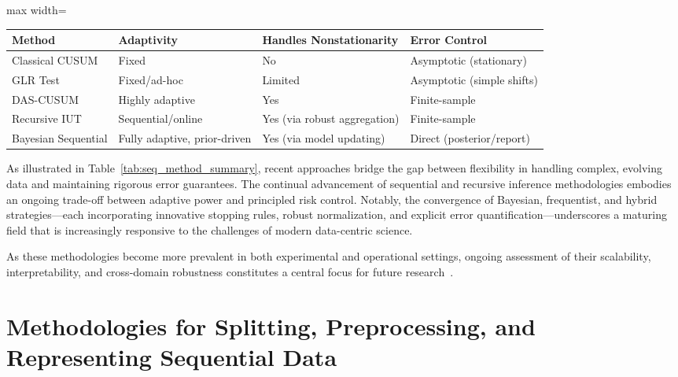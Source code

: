 \documentclass[sigconf]{acmart}
\begin{document}
\begin{table*}[htbp]
\centering
\caption{Summary of Key Sequential Testing Methodologies and Features}
\label{tab:seq_method_summary}
\begin{adjustbox}{max width=\textwidth}
\begin{tabular}{llll}
\toprule
\textbf{Method}            & \textbf{Adaptivity}           & \textbf{Handles Nonstationarity}  & \textbf{Error Control}      \\
\midrule
Classical CUSUM           & Fixed                         & No                                & Asymptotic (stationary)     \\
GLR Test                  & Fixed/ad-hoc                  & Limited                           & Asymptotic (simple shifts)  \\
DAS-CUSUM                 & Highly adaptive               & Yes                               & Finite-sample               \\
Recursive IUT             & Sequential/online             & Yes (via robust aggregation)      & Finite-sample               \\
Bayesian Sequential       & Fully adaptive, prior-driven  & Yes (via model updating)          & Direct (posterior/report)   \\
\bottomrule
\end{tabular}
\end{adjustbox}
\end{table*}

As illustrated in Table~\ref{tab:seq_method_summary}, recent approaches bridge the gap between flexibility in handling complex, evolving data and maintaining rigorous error guarantees. The continual advancement of sequential and recursive inference methodologies embodies an ongoing trade-off between adaptive power and principled risk control. Notably, the convergence of Bayesian, frequentist, and hybrid strategies—each incorporating innovative stopping rules, robust normalization, and explicit error quantification—underscores a maturing field that is increasingly responsive to the challenges of modern data-centric science.

As these methodologies become more prevalent in both experimental and operational settings, ongoing assessment of their scalability, interpretability, and cross-domain robustness constitutes a central focus for future research~\cite{ref8, ref11, ref15, ref17, ref18, ref19, ref26, ref29, ref31, ref66, ref78, ref81, ref86}.

\section{Methodologies for Splitting, Preprocessing, and Representing Sequential Data}
\end{document}
